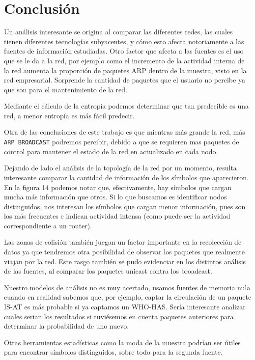 \section{Conclusión}

Un análisis interesante se origina al comparar las diferentes redes, las cuales tienen diferentes tecnologías subyacentes, y cómo esto afecta notoriamente a las fuentes de información estudiadas. Otro factor que afecta a las fuentes es el uso que se le da a la red, por ejemplo como el incremento de la actividad interna de la red aumenta la proporción de paquetes ARP dentro de la muestra, visto en la red empresarial. Sorprende la cantidad de paquetes que el usuario no percibe ya que son para el mantenimiento de la red.

Mediante el cálculo de la entropía podemos determinar que tan predecible es una red, a menor entropía es más fácil predecir.

Otra de las conclusiones de este trabajo es que mientras más grande la red, más \texttt{ARP BROADCAST} podremos percibir, debido a que se requieren mas paquetes de control para mantener el estado de la red en actualizado en cada nodo.

Dejando de lado el análisis de la topología de la red por un momento, resulta interesante comparar la cantidad de información de los símbolos que aparecieron. En la figura 14 podemos notar que, efectivamente, hay símbolos que cargan mucha más información que otros. Si lo que buscamos es identificar nodos distinguidos, nos interesan los símbolos que cargan menor información, pues son los más frecuentes e indican actividad intensa (como puede ser la actividad correspondiente a un router).

Las zonas de colisión también juegan un factor importante en la recolección de datos ya que tendremos otra posibilidad de observar los paquetes que realmente viajan por la red. Este rasgo también se pudo evidenciar en los distintos análisis de las fuentes, al comparar los paquetes unicast contra los broadcast.

Nuestro modelos de análisis no es muy acertado, usamos fuentes de memoria nula cuando en realidad sabemos que, por ejemplo, captar la circulación de un paquete IS-AT es más probable si ya captamos un WHO-HAS. Sería interesante analizar cuales serian los resultados si tuviésemos en cuenta paquetes anteriores para determinar la probabilidad de uno nuevo.

Otras herramientas estadísticas como la moda de la muestra podrían ser útiles para encontrar símbolos distinguidos, sobre todo para la segunda fuente.

